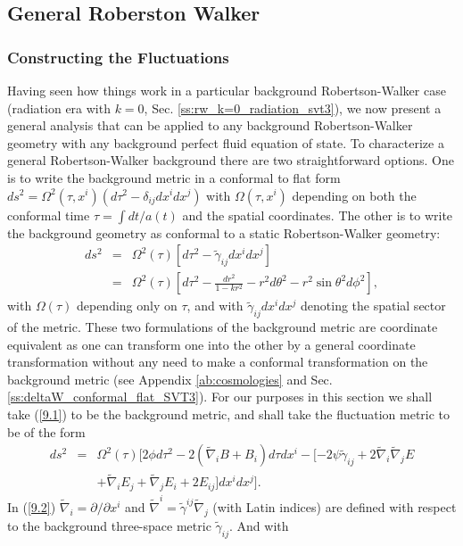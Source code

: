 \subsection{General Roberston Walker}
\label{ss:general_rw_svt3}
\subsubsection{Constructing the Fluctuations}
\label{sss:setting_up_the_equations}


Having seen how things work in a particular background Robertson-Walker case (radiation era with $k=0$, Sec. \ref{ss:rw_k=0_radiation_svt3}), we now present a general analysis that can be applied to any background Robertson-Walker geometry with any background perfect fluid equation of state. To characterize a general Robertson-Walker background there are two straightforward options. One is to write the background metric in a conformal to flat form $ds^2=\Omega^2(\tau,x^i)(d\tau^2-\delta_{ij}dx^idx^j)$ with $\Omega(\tau,x^i)$ depending on both the conformal time $\tau=\int dt/a(t)$ and the spatial coordinates. The other is to write the background geometry as conformal to a static Robertson-Walker geometry: 
%
\begin{eqnarray}
ds^2&=&\Omega^2(\tau)[d\tau^2-\tilde{\gamma}_{ij}dx^idx^j]
\nonumber\\
&=&\Omega^2(\tau)\left[ d\tau^2-\frac{dr^2}{1-kr^2}-r^2d\theta^2-r^2\sin\theta^2d\phi^2\right],
\label{9.1}
\end{eqnarray}
%
with $\Omega(\tau)$ depending only on $\tau$, and with $\tilde{\gamma}_{ij}dx^idx^j$ denoting the spatial sector of the metric. These two formulations of the background metric are coordinate equivalent as one can transform one into the other by a general coordinate transformation without any need to make a conformal transformation on the background metric (see Appendix \ref{ab:cosmologies} and Sec. \ref{ss:deltaW_conformal_flat_SVT3}). For our purposes in this section we shall take (\ref{9.1}) to be the background metric, and shall take the fluctuation metric to be of the form
%
\begin{eqnarray}
ds^2&=&\Omega^2(\tau)\bigg[2\phi d\tau^2 -2(\tilde{\nabla}_i B +B_i)d\tau dx^i - [-2\psi\tilde{\gamma}_{ij} +2\tilde{\nabla}_i\tilde{\nabla}_j E
\nonumber\\
&& + \tilde{\nabla}_i E_j + \tilde{\nabla}_j E_i + 2E_{ij}]dx^i dx^j\bigg].
\label{9.2}
\end{eqnarray}
%
In (\ref{9.2})  $\tilde{\nabla}_i=\partial/\partial x^i$ and  $\tilde{\nabla}^i=\tilde{\gamma}^{ij}\tilde{\nabla}_j$  (with Latin indices) are defined with respect to the background three-space metric $\tilde{\gamma}_{ij}$. And with
